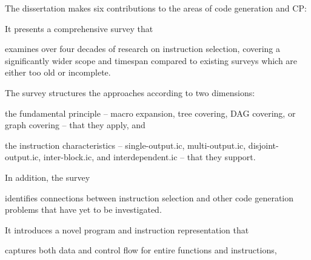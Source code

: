 The dissertation makes six contributions to the areas of \gls{code generation}
and \glsdesc{CP}:
%
\begin{contributions}
  \item {}
    It presents a comprehensive survey that
    \begin{contributions}
      \item {}
        examines over four decades of research on \gls{instruction selection},
        covering a significantly wider scope and timespan compared to existing
        surveys \cite{Cattell:1977, GanapathiEtAl:1982:Survey, Lunell:1983,
          Leupers:2000:Survey, BoulytchevLomov:2001} which are either too old
        or incomplete.
    \end{contributions}
    The survey structures the approaches according to two dimensions:
    \begin{contributions}[resume]
      \item {}
        the fundamental \gls{principle} -- \gls{macro expansion}, \gls{tree
          covering}, \gls{DAG covering}, or \gls{graph covering} -- that they
        apply, and
    \end{contributions}
    \begin{contributions}[resume]
      \item {}
        the \glspl{instruction characteristic} -- \gls{single-output.ic},
        \gls{multi-output.ic}, \gls{disjoint-output.ic}, \gls{inter-block.ic},
        and \gls{interdependent.ic} -- that they support.
    \end{contributions}
    In addition, the survey
    \begin{contributions}[resume]
      \item {}
        identifies connections between \gls{instruction selection} and other
        \gls{code generation} problems that have yet to be investigated.
    \end{contributions}
  \item {}
    It introduces a novel \gls{program} and \gls{instruction} representation
    that
    \begin{contributions}
      \item {}
        captures both data and control flow for entire \glspl{function} and
        \glspl{instruction},

\end{contributions}
\end{contributions}
